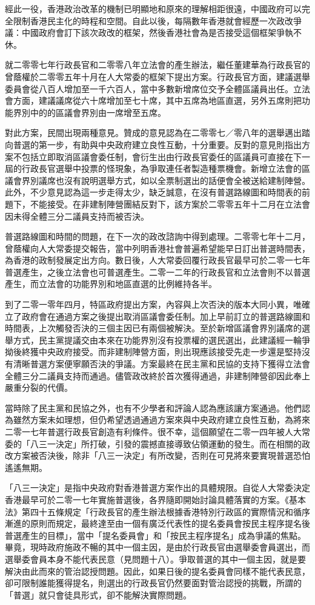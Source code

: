 經此一役，香港政治改革的機制已明顯地和原來的理解相距很遠，中國政府可以完全限制香港民主化的時程和空間。自此以後，每隔數年香港就會經歷一次政改爭議：中國政府會訂下該次政改的框架，然後香港社會為是否接受這個框架爭執不休。

就二零零七年行政長官和二零零八年立法會的產生辦法，繼任董建華為行政長官的曾蔭權於二零零五年十月在人大常委的框架下提出方案。行政長官方面，建議選舉委員會從八百人增加至一千六百人，當中多數新增席位交予全體區議員出任。立法會方面，建議議席從六十席增加至七十席，其中五席為地區直選，另外五席則把功能界別中的的區議會界別由一席增至五席。

對此方案，民間出現兩種意見。贊成的意見認為在二零零七／零八年的選舉邁出踏向普選的第一步，有助與中央政府建立良性互動，十分重要。反對的意見則指出方案不包括立即取消區議會委任制，會衍生出由行政長官委任的區議員可直接在下一屆的行政長官選舉中投票的怪現象，為爭取連任者製造種票機會。新增立法會的區議會界別議席也沒有說明選舉方式，如以全票制選出的話便會全被送給建制陣營。此外，不少意見認為這一步走得太少，缺乏誠意，在沒有普選路線圖和時間表的前題下，不能接受。在非建制陣營團結反對下，該方案於二零零五年十二月在立法會因未得全體三分二議員支持而被否決。

普選路線圖和時間的問題，在下一次的政改諮詢中得到處理。二零零七年十二月，曾蔭權向人大常委提交報告，當中列明香港社會普遍希望能早日訂出普選時間表，為香港的政制發展定出方向。數日後，人大常委回覆行政長官最早可於二零一七年普選產生，之後立法會也可普選產生。二零一二年的行政長官和立法會則不以普選產生，而立法會的功能界別和地區直選的比例維持各半。

到了二零一零年四月，特區政府提出方案，內容與上次否決的版本大同小異，唯確立了政府會在通過方案之後提出取消區議會委任制。加上早前訂立的普選路線圖和時間表，上次觸發否決的三個主因已有兩個被解決。至於新增區議會界別議席的選舉方式，民主黨提議交由本來在功能界別沒有投票權的選民選出，此建議經一輪爭拗後終獲中央政府接受。而非建制陣營方面，則出現應該接受先走一步還是堅持沒有清晰普選方案便寧願否決的爭議。方案最終在民主黨和民協的支持下獲得立法會全體三分二議員支持而通過。儘管政改終於首次獲得通過，非建制陣營卻因此奉上嚴重分裂的代價。

當時除了民主黨和民協之外，也有不少學者和評論人認為應該讓方案通過。他們認為雖然方案未如理想，但仍希望透過通過方案來與中央政府建立良性互動，為將來二零一七年普選行政長官創造有利條件。很不幸，這個願望在二零一四年被人大常委的「八三一決定」所打破，引發的震撼直接導致佔領運動的發生。而在相關的政改方案被否決後，除非「八三一決定」有所改變，否則在可見將來要實現普選恐怕遙遙無期。

「八三一決定」是指中央政府對香港普選方案作出的具體規限。自從人大常委決定香港最早可於二零一七年實施普選後，各界隨即開始討論具體落實的方案。《基本法》第四十五條規定「行政長官的產生辦法根據香港特別行政區的實際情況和循序漸進的原則而規定，最終達至由一個有廣泛代表性的提名委員會按民主程序提名後普選產生的目標」，當中「提名委員會」和「按民主程序提名」成為爭議的焦點。畢竟，現時政府施政不暢的其中一個主因，是由於行政長官由選舉委會員選出，而選舉委會員本身不能代表民意（見問題十八）。爭取普選的其中一個主因，就是要解決由此而來的管治認授問題。因此，如果日後的提名委員會同樣不能代表民意，卻可限制誰能獲得提名，則選出的行政長官仍然要面對管治認授的挑戰，所謂的「普選」就只會徒具形式，卻不能解決實際問題。

